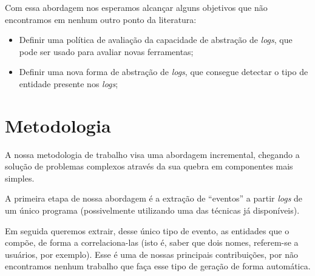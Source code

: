 \documentclass[
	12pt,				%
	openright,			%
	twoside,			%
	a4paper,			%
	english,			%
	spanish,			%
	brazil,				%
	]{abntex2}
\begin{document}
Com essa abordagem nos esperamos alcançar alguns objetivos que não encontramos em nenhum outro ponto da literatura:

\begin{itemize}
	\item Definir uma política de avaliação da capacidade de abstração de \emph{logs}, que pode ser usado para avaliar novas ferramentas;
	\item Definir uma nova forma de abstração de \emph{logs}, que consegue detectar o tipo de entidade presente nos \emph{logs};
\end{itemize}

\section{Metodologia}

%
%
%
%

A nossa metodologia de trabalho visa uma abordagem incremental, chegando a solução de problemas complexos através da sua quebra em componentes mais simples.

A primeira etapa de nossa abordagem é a extração de ``eventos'' a partir \emph{logs} de um único programa (possivelmente utilizando uma das técnicas já disponíveis).

Em seguida queremos extrair, desse único tipo de evento, as entidades que o compõe, de forma a correlaciona-las (isto é, saber que dois nomes, referem-se a usuários, por exemplo). Esse é uma de nossas principais contribuições, por não encontramos nenhum trabalho que faça esse tipo de geração de forma automática.
\end{document}
